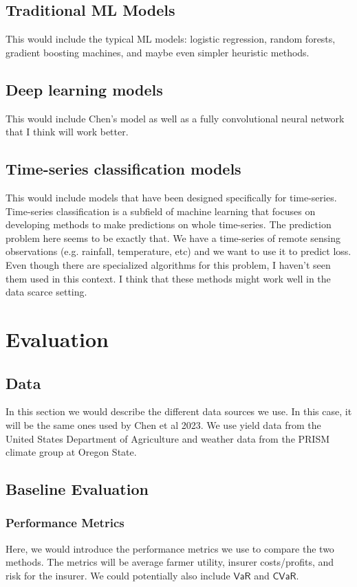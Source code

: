 \documentclass[11pt]{article}
\begin{document}
  \subsection{Traditional ML Models}
    This would include the typical ML models: logistic regression, random forests, gradient boosting machines, and maybe even simpler heuristic methods. 
  \subsection{Deep learning models}
    This would include Chen's model as well as a fully convolutional neural network that I think will work better. 
  \subsection{Time-series classification models}
    This would include models that have been designed specifically for time-series. Time-series classification is a subfield of machine learning that focuses on developing methods to make predictions on whole time-series. The prediction problem here seems to be exactly that. We have a time-series of remote sensing observations (e.g. rainfall, temperature, etc) and we want to use it to predict loss. Even though there are specialized algorithms for this problem, I haven't seen them used in this context. I think that these methods might work well in the data scarce setting.  

\section{Evaluation}
  \subsection{Data}
    In this section we would describe the different data sources we use. In this case, it will be the same ones used by Chen et al 2023. We use yield data from the United States Department of Agriculture and weather data from the PRISM climate group at Oregon State. 
  \subsection{Baseline Evaluation}
    \subsubsection{Performance Metrics}
      Here, we would introduce the performance metrics we use to compare the two methods. The metrics will be average farmer utility, insurer costs/profits, and risk for the insurer. We could potentially also include $\textsf{VaR}$ and $\textsf{CVaR}$. 
\end{document}
